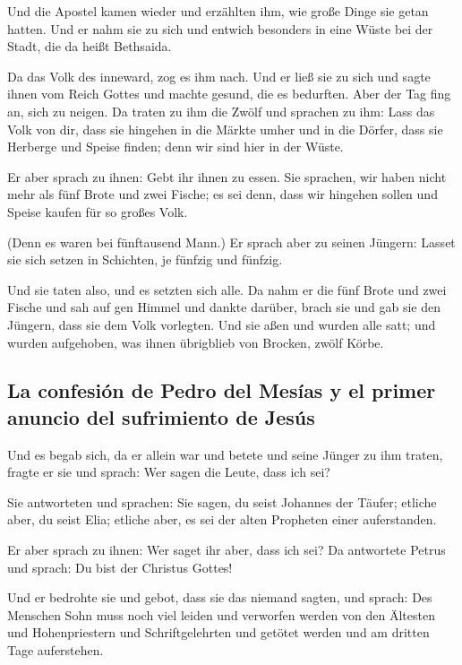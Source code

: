  Und die Apostel kamen wieder und erzählten ihm, wie
große Dinge sie getan hatten. Und er nahm sie zu sich und entwich
besonders in eine Wüste bei der Stadt, die da heißt Bethsaida.

 Da das Volk des inneward, zog es ihm nach. Und er ließ
sie zu sich und sagte ihnen vom Reich Gottes und machte gesund, die es
bedurften. Aber der Tag fing an, sich zu neigen.  Da
traten zu ihm die Zwölf und sprachen zu ihm: Lass das Volk von dir, dass
sie hingehen in die Märkte umher und in die Dörfer, dass sie Herberge
und Speise finden; denn wir sind hier in der Wüste.

 Er aber sprach zu ihnen: Gebt ihr ihnen zu essen. Sie
sprachen, wir haben nicht mehr als fünf Brote und zwei Fische; es sei
denn, dass wir hingehen sollen und Speise kaufen für so großes Volk.

 (Denn es waren bei fünftausend Mann.) Er sprach aber zu
seinen Jüngern: Lasset sie sich setzen in Schichten, je fünfzig und
fünfzig.

 Und sie taten also, und es setzten sich alle.
 Da nahm er die fünf Brote und zwei Fische und sah auf
gen Himmel und dankte darüber, brach sie und gab sie den Jüngern, dass
sie dem Volk vorlegten.  Und sie aßen und wurden alle
satt; und wurden aufgehoben, was ihnen übrigblieb von Brocken, zwölf
Körbe.

\hypertarget{la-confesiuxf3n-de-pedro-del-mesuxedas-y-el-primer-anuncio-del-sufrimiento-de-jesuxfas}{%
\subsection{La confesión de Pedro del Mesías y el primer anuncio del
sufrimiento de
Jesús}\label{la-confesiuxf3n-de-pedro-del-mesuxedas-y-el-primer-anuncio-del-sufrimiento-de-jesuxfas}}

 Und es begab sich, da er allein war und betete und seine
Jünger zu ihm traten, fragte er sie und sprach: Wer sagen die Leute,
dass ich sei?

 Sie antworteten und sprachen: Sie sagen, du seist
Johannes der Täufer; etliche aber, du seist Elia; etliche aber, es sei
der alten Propheten einer auferstanden.

 Er aber sprach zu ihnen: Wer saget ihr aber, dass ich
sei? Da antwortete Petrus und sprach: Du bist der Christus Gottes!

 Und er bedrohte sie und gebot, dass sie das niemand
sagten,  und sprach: Des Menschen Sohn muss noch viel
leiden und verworfen werden von den Ältesten und Hohenpriestern und
Schriftgelehrten und getötet werden und am dritten Tage auferstehen.

